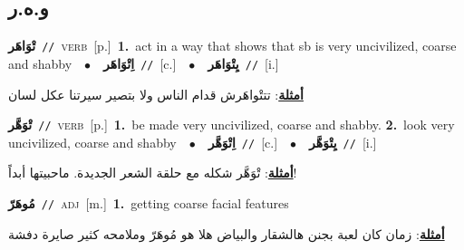 \documentclass[10pt,a4paper,twoside]{article} %
\begin{document}
\begin{multicols}{2}
\vspace{-3mm}
\subsection*{\color{blue}\foreignlanguage{arabic}{و.ه.ر}\color{blue}{}} 

{\setlength\topsep{0pt}\textbf{\foreignlanguage{arabic}{تْوَاهَر}}\ {\color{gray}\texttt{//}\color{black}}\ \textsc{verb}\ [p.]\ \textbf{1.}~act in a way that shows that sb is very uncivilized, coarse and shabby\ \ $\bullet$\ \ \setlength\topsep{0pt}\textbf{\foreignlanguage{arabic}{اِتْوَاهَر}}\ {\color{gray}\texttt{//}\color{black}}\ [c.]\ \ $\bullet$\ \ \setlength\topsep{0pt}\textbf{\foreignlanguage{arabic}{يِتْوَاهَر}}\ {\color{gray}\texttt{//}\color{black}}\ [i.]\  \begin{flushright}\color{gray}\foreignlanguage{arabic}{\textbf{\underline{\foreignlanguage{arabic}{أمثلة}}}: تتتْواهَرش قدام الناس ولا بتصير سيرتنا عكل لسان}\end{flushright}\color{black}} \vspace{2mm}

{\setlength\topsep{0pt}\textbf{\foreignlanguage{arabic}{تْوَهَّر}}\ {\color{gray}\texttt{//}\color{black}}\ \textsc{verb}\ [p.]\ \textbf{1.}~be made very uncivilized, coarse and shabby.  \textbf{2.}~look very uncivilized, coarse and shabby\ \ $\bullet$\ \ \setlength\topsep{0pt}\textbf{\foreignlanguage{arabic}{اِتْوَهَّر}}\ {\color{gray}\texttt{//}\color{black}}\ [c.]\ \ $\bullet$\ \ \setlength\topsep{0pt}\textbf{\foreignlanguage{arabic}{يِتْوَهَّر}}\ {\color{gray}\texttt{//}\color{black}}\ [i.]\  \begin{flushright}\color{gray}\foreignlanguage{arabic}{\textbf{\underline{\foreignlanguage{arabic}{أمثلة}}}: تْوَهَّر شكله مع حلقة الشعر الجديدة. ماحبيتها أبداً!}\end{flushright}\color{black}} \vspace{2mm}

{\setlength\topsep{0pt}\textbf{\foreignlanguage{arabic}{مُوهَرّ}}\ {\color{gray}\texttt{//}\color{black}}\ \textsc{adj}\ [m.]\ \textbf{1.}~getting coarse facial features\  \begin{flushright}\color{gray}\foreignlanguage{arabic}{\textbf{\underline{\foreignlanguage{arabic}{أمثلة}}}: زمان كان لعبة بجنن هالشقار والبياض هلا هو مُوهَرّ وملامحه كثير صايرة دفشة}\end{flushright}\color{black}} \vspace{2mm}


\end{multicols}
\end{document}
